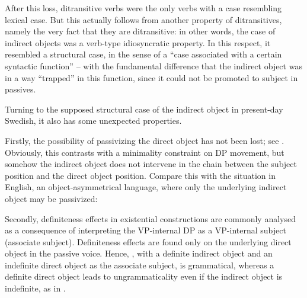 \documentclass[output=paper]{langscibook}
\begin{document}
\begin{sloppypar}
After this loss, ditransitive verbs were the only verbs with a case resembling lexical case. But this actually follows from another property of ditransitives, namely the very fact that they are ditransitive: in other words, the case of indirect objects was a verb-type idiosyncratic property. In this respect, it resembled a structural case, in the sense of a “case associated with a certain syntactic function” – with the fundamental difference that the indirect object was in a way “trapped” in this function, since it could not be promoted to subject in passives.
\end{sloppypar}


Turning to the supposed structural case of the indirect object in present-day Swedish, it also has some unexpected properties. 



Firstly, the possibility of passivizing the direct object has not been lost; see . Obviously, this contrasts with a minimality constraint on DP movement, but somehow the indirect object does not intervene in the chain between the subject position and the direct object position. Compare this with the situation in English, an object-asymmetrical language, where only the underlying indirect object may be passivized:


\ea%
    \label{ex:falk:6}
\z
\z


Secondly, definiteness effects in existential constructions are commonly analysed as a consequence of interpreting the VP-internal DP as a VP-internal subject (associate subject). Definiteness effects are found only on the underlying direct object in the passive voice. Hence, , with a definite indirect object and an indefinite direct object as the associate subject, is grammatical, whereas a definite direct object leads to ungrammaticality even if the indirect object is indefinite, as in .

\ea%
    \label{ex:falk:7}

\z
\z
\end{document}
